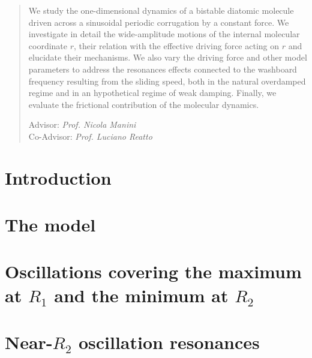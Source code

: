 \documentclass[a4paper,12pt]{article}
\begin{document}
\begin{abstract}
We study the one-dimensional dynamics of a bistable diatomic molecule driven across a sinusoidal periodic corrugation by a constant force. We investigate in detail the wide-amplitude motions of the internal molecular coordinate $r$, their relation with the effective driving force acting on $r$ and elucidate their mechanisms.
We also vary the driving force and other model parameters to address the resonances effects connected to the washboard frequency resulting from the sliding speed, both in the natural overdamped regime and in an hypothetical regime of weak damping. Finally, we evaluate the frictional contribution of the molecular dynamics.

\vskip0.75cm
\hskip5cm
\parbox[t]{7cm}
{
Advisor: {\it Prof. Nicola Manini}\\
Co-Advisor: {\it Prof. Luciano Reatto}
}
\end{abstract}

\clearpage
\tableofcontents

\clearpage

\section{Introduction}

	


\section{The model}\label{model:sec}

	


\section{Oscillations covering the maximum at $R_1$ and the minimum at $R_2$}\label{oscillations:sec}

    

\section{Near-$R_2$ oscillation resonances}\label{resonances:sec}
\end{document}
